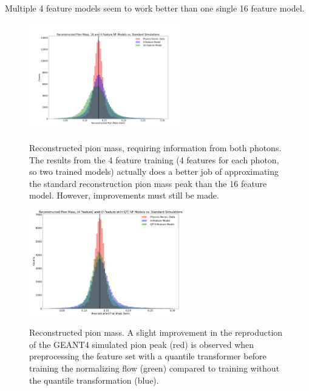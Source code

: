 Multiple 4 feature models seem to work better than one single 16 feature model.

\begin{figure}[htb]
\centering
\includegraphics[width = 0.6\textwidth]{Chapters/Ch3-Simulations/normalizing_flows/pics/MeetingFigures/Bobby/Reconstructed_Pion_Mass,_16_and_4_Feature_NF_Models_vs_Standard_Simulations.png}
\label{fig: jul8_pion_comparison5}
\caption{Reconstructed pion mass, requiring information from both photons. The results from the 4 feature training (4 features for each photon, so two trained models) actually does a better job of approximating the standard reconstruction pion mass peak than the 16 feature model. However, improvements must still be made. }
\end{figure}


\begin{figure}[htb]
\centering
\includegraphics[width = 0.6\textwidth]{Chapters/Ch3-Simulations/normalizing_flows/pics/MeetingFigures/Bobby/qt-3-4.png}
\label{fig: jul8_pion_comparison}
\caption{Reconstructed pion mass. A slight improvement in the reproduction of the GEANT4 simulated pion peak (red) is observed when preprocessing the feature set with a quantile transformer before training the normalizing flow (green) compared to training without the quantile transformation (blue). }
\end{figure}





